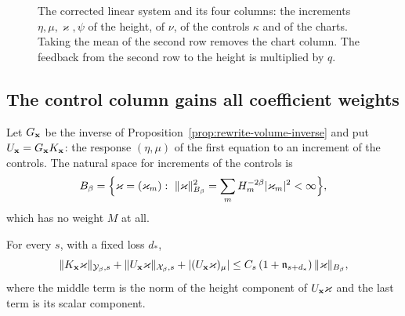 \begin{figure}[htbp]
\centering
{}
\caption{The corrected linear system and its four columns: the
increments $\eta,\mu,\varkappa,\psi$ of the height, of $\nu$, of the
controls $\kappa$ and of the charts. Taking the mean of the second
row removes the chart column. The feedback from the second row to the
height is multiplied by $q$.}
\label{fig:coupled-columns}
\end{figure}

\subsection{The control column gains all coefficient weights}

Let $G_{\mathbf x}$ be the inverse of
Proposition~\ref{prop:rewrite-volume-inverse} and put
$U_{\mathbf x}=G_{\mathbf x}K_{\mathbf x}$: the response $(\eta,\mu)$ of the first
equation to an increment of the controls. The natural space for
increments of the controls is
\[
 B_\beta=\Bigl\{\varkappa=(\varkappa_m):\
 \|\varkappa\|_{B_\beta}^2=\sum_mH_m^{-2\beta}|\varkappa_m|^2<\infty\Bigr\},
\]
which has no weight $M$ at all.

\begin{lemma}\label{lem:control-smoothing}
For every $s$, with a fixed loss $d_*$,
\begin{equation}\label{eq:weak-control-smoothing}
 \|K_{\mathbf x}\varkappa\|_{\mathcal Y_\beta,s}
 +\|U_{\mathbf x}\varkappa\|_{\mathcal X_\beta,s}+|(U_{\mathbf x}\varkappa)_{\mu}|
 \le C_s\,(1+\mathfrak n_{s+d_*})\,\|\varkappa\|_{B_\beta} ,
\end{equation}
where the middle term is the norm of the height component of
$U_{\mathbf x}\varkappa$ and the last term is its scalar component.
\end{lemma}

